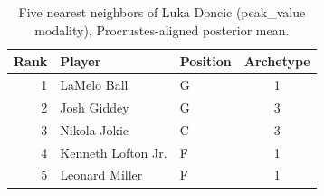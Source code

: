 \begin{table}[htbp]
  \centering\small
  \begin{tabular}{rllc}
    \toprule
    Rank & Player & Position & Archetype \\
    \midrule
    1 & LaMelo Ball & G & 1 \\
    2 & Josh Giddey & G & 3 \\
    3 & Nikola Jokic & C & 3 \\
    4 & Kenneth Lofton Jr. & F & 1 \\
    5 & Leonard Miller & F & 1 \\
    \bottomrule
  \end{tabular}
  \caption{Five nearest neighbors of Luka Doncic (peak_value modality), Procrustes-aligned posterior mean.}
  \label{tab:Luka_Doncic_neighbors_peak_value}
\end{table}

